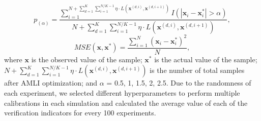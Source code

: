 \documentclass[mathematics,article,accept,pdftex,moreauthors]{Definitions/mdpi}
\begin{document}
$$p_{(\alpha)} = \frac{\sum_{i=1}^{N+\sum_{d=1}^{K}\sum_{i=1}^{N/K-1} \eta \cdot L(\bm{x}^{(d,i)}, \bm{x}^{(d,i+1)})}I(|\bm{x}_{i} - \bm{x}_{i}^{*}| > \alpha)}
	{N+\sum_{d=1}^{K}\sum_{i=1}^{N/K-1} \eta \cdot L(\bm{x}^{(d,i)}, \bm{x}^{(d,i+1)})} ,$$
$$MSE(\bm{x}, \bm{x}^{*}) = \frac{\sum_{i=1}^{N}(\bm{x}_{i} - \bm{x}_{i}^{*})^{2}}{N} ,$$
where $\bm{x}$ is the observed value of the sample; $\bm{x}^{*}$ is the actual value of the sample; $N+\sum_{d=1}^{K}\sum_{i=1}^{N/K-1} \eta \cdot L(\bm{x}^{(d,i)}, \bm{x}^{(d,i+1)})$ is the number of total samples after AMLI optimization; and $\alpha$ = 0.5, 1, 1.5, 2, 2.5. Due to the randomness of each experiment, we selected different hyperparameters to perform multiple calibrations in each simulation and calculated the average value of each of the verification indicators for every 100 experiments.
\end{document}
